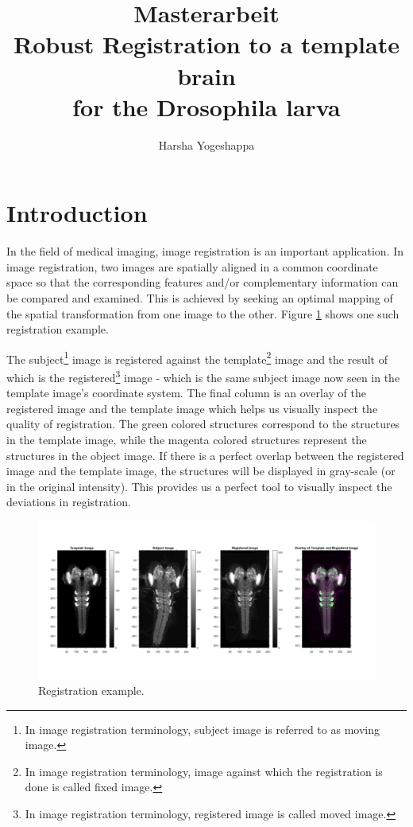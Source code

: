\documentclass{article}
\title{
	Masterarbeit \\
	Robust Registration to a template brain  \\
	for the Drosophila larva \large }
\author{Harsha Yogeshappa}
\begin{document}
	\maketitle
	\newpage
	
	\tableofcontents
	\newpage
	\section{Introduction}
	In the field of medical imaging, image registration is an important application. In image registration, two images are spatially aligned in a common coordinate space so that the corresponding features and/or complementary information can be compared and examined. This is achieved by seeking an optimal mapping of the spatial transformation from one image to the other. Figure \ref{fig:Registraion} shows one such registration example. \newline
	
	The subject\footnote{In image registration terminology, subject image is referred to as moving image.} image is registered against the template\footnote{In image registration terminology, image against which the registration is done is called fixed image.} image and the result of which is the registered\footnote{In image registration terminology, registered image is called moved image.} image - which is the same subject image now seen in the template image's coordinate system. The final column is an overlay of the registered image and the template image which helps us visually inspect the quality of registration. The green colored structures correspond to the structures in the template image, while the magenta colored structures represent the structures in the object image. If there is a perfect overlap between the registered image and the template image, the structures will be displayed in gray-scale (or in the original intensity). This provides us a perfect tool to visually inspect the deviations in registration.
		
	\begin{figure}[H]
		\centering
		\includegraphics[width=\linewidth]{resources/introduction_fig_1.jpg}
		\caption{Registration example.}
		\label{fig:Registraion}
	\end{figure}
\end{document}
